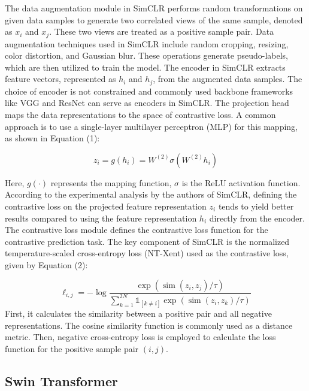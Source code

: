 \documentclass[10pt,twocolumn,a4paper]{article}
\begin{document}
The data augmentation module in SimCLR performs random transformations on given data samples to generate two correlated views of the same sample, denoted as $x_i$ and $x_j$. These two views are treated as a positive sample pair. Data augmentation techniques used in SimCLR include random cropping, resizing, color distortion, and Gaussian blur. These operations generate pseudo-labels, which are then utilized to train the model.
The encoder in SimCLR extracts feature vectors, represented as $h_i$ and $h_j$, from the augmented data samples. The choice of encoder is not constrained and commonly used backbone frameworks like VGG and ResNet can serve as encoders in SimCLR.
The projection head maps the data representations to the space of contrastive loss. A common approach is to use a single-layer multilayer perceptron (MLP) for this mapping, as shown in Equation (1):

\begin{equation}
z_i=g\left(h_i\right)=W^{(2)} \sigma\left(W^{(2)} h_i\right)
\end{equation}

Here, $g(\cdot)$ represents the mapping function,  $\sigma$ is the ReLU activation function. According to the experimental analysis by the authors of SimCLR, defining the contrastive loss on the projected feature representation $z_i$ tends to yield better results compared to using the feature representation $h_i$ directly from the encoder.
The contrastive loss module defines the contrastive loss function for the contrastive prediction task. The key component of SimCLR is the normalized temperature-scaled cross-entropy loss (NT-Xent) used as the contrastive loss, given by Equation (2):

\begin{equation}
  \ell_{i, j}=-\log \frac{\exp \left(\operatorname{sim}\left(z_i, z_j\right) / \tau\right)}{\sum_{k=1}^{2 N} \mathbb{1}_{[k \neq i]} \exp \left(\operatorname{sim}\left(z_i, z_k\right) / \tau\right)}
\end{equation}
First, it calculates the similarity between a positive pair and all negative representations. The cosine similarity function is commonly used as a distance metric. Then, negative cross-entropy loss is employed to calculate the loss function for the positive sample pair $(i, j)$.



\subsection{Swin Transformer}
\end{document}
